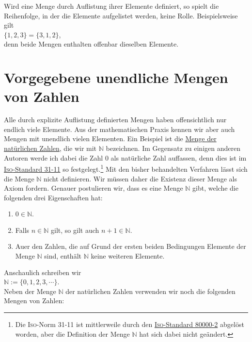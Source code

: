 Wird eine Menge durch Auflistung ihrer Elemente definiert, so spielt die Reihenfolge, in der die
Elemente aufgelistet werden, keine Rolle.  Beispielsweise gilt
\\[0.2cm]
\hspace*{1.3cm}
$\{1,2,3\} = \{3,1,2\}$,
\\[0.2cm]
denn beide Mengen enthalten offenbar dieselben Elemente.

\section{Vorgegebene unendliche Mengen von Zahlen}
Alle durch explizite Auflistung definierten Mengen haben offensichtlich nur endlich viele
Elemente.  Aus der mathematischen Praxis kennen wir aber auch Mengen mit unendlich vielen
Elementen.  Ein Beispiel ist die 
\href{http://en.wikipedia.org/wiki/Natural_number}{Menge der nat\"{u}rlichen Zahlen}, die wir mit $\mathbb{N}$
bezeichnen.  Im Gegensatz zu einigen anderen Autoren werde ich dabei die Zahl $0$ 
als nat\"{u}rliche Zahl auffassen, denn dies ist im
\href{https://en.wikipedia.org/wiki/ISO_31-11}{\textsc{Iso}-Standard 31-11} so festgelegt.\footnote{
  Die \textsc{Iso}-Norm 31-11 ist mittlerweile durch den
  \href{https://en.wikipedia.org/wiki/ISO_80000-2}{\textsc{Iso}-Standard 80000-2} abgel\"{o}st worden,
  aber die Definition der Menge $\mathbb{N}$ hat sich dabei nicht ge\"{a}ndert.
}
Mit den bisher behandelten Verfahren l\"{a}sst sich die Menge $\mathbb{N}$  nicht definieren.
Wir m\"{u}ssen daher die Existenz dieser Menge als Axiom fordern.  Genauer postulieren wir, dass es eine
Menge $\mathbb{N}$ gibt, welche die folgenden drei Eigenschaften hat:
\begin{enumerate}
\item $0 \in \mathbb{N}$.
\item Falls $n \in \mathbb{N}$ gilt, so gilt auch $n+1 \in \mathbb{N}$.
\item Au\3er den Zahlen, die auf Grund der ersten beiden Bedingungen Elemente der Menge $\mathbb{N}$ sind, enth\"{a}lt
      $\mathbb{N}$ keine weiteren Elemente.
\end{enumerate}
Anschaulich schreiben wir \\[0.2cm]
\hspace*{1.3cm} $\mathbb{N} := \{ 0, 1, 2, 3, \cdots \}$. \\[0.2cm]
Neben der Menge $\mathbb{N}$ der nat\"{u}rlichen Zahlen verwenden wir noch die folgenden
Mengen von Zahlen: 
